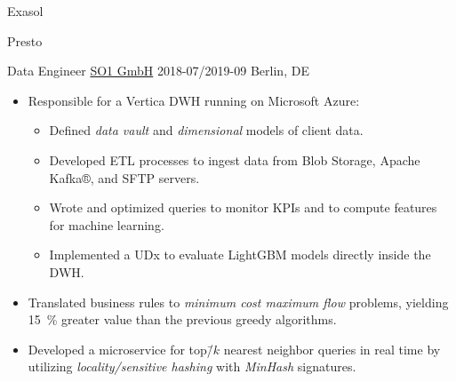 \documentclass[11pt,letterpaper]{article}%
\begin{document}
\begin{minipage}[t]{0.575\textwidth}
{\begin{adjustbox}{valign=m,minipage=.15\linewidth,margin=0 0 0 16pt}
      \begin{tcolorbox}[remember as=Exasol,width=\linewidth]
        Exasol
      \end{tcolorbox}%
      \newline%
      \begin{tcolorbox}[remember as=Presto,width=\linewidth]
        Presto
      \end{tcolorbox}%
    \end{adjustbox}%
    \medskip
  }

  \WorkEntry%
  {Data Engineer}%
  {\href{https://www.so1.ai/en/}{SO1 GmbH}}%
  {2018-07/2019-09}%
  {Berlin, DE}%
  {%
    \begin{itemize}[nosep,leftmargin=*]
    \item Responsible for a Vertica DWH running on Microsoft Azure:
      \begin{itemize}[nosep]
      \item Defined \emph{data vault} and \emph{dimensional} models of client
        data.
      \item Developed ETL processes to ingest data from Blob Storage, Apache
        Kafka®, and SFTP servers.
      \item Wrote and optimized queries to monitor KPIs and to compute features
        for machine learning.
      \item Implemented a UDx to evaluate LightGBM models directly inside the
        DWH\@.
      \end{itemize}
    \item Translated business rules to \emph{minimum cost maximum flow}
      problems, yielding \SI{15}{\percent} greater value than the previous
      greedy algorithms.
    \item Developed a microservice for top\=/\(k\) nearest neighbor queries in
      real time by utilizing \emph{locality\-/sensitive hashing} with
      \emph{MinHash} signatures.
    \end{itemize}
  }


\end{minipage}
\end{document}
